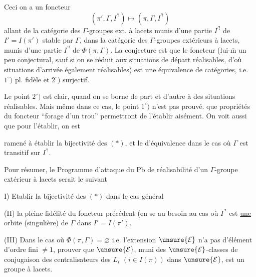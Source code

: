 Ceci   on a  un foncteur
\[
(\pi',\Gamma,I^{\prime !})\longmapsto(\pi,\Gamma,I^{\prime !})
\]
allant de la catégorie des $\Gamma$-groupes ext. à lacets
 munis d'une partie $I^{\prime !}$ de $I'=I(\pi')$ stable
par $\Gamma$, dans la catégorie des $\Gamma$-groupes extérieurs à lacets, munis d'une partie $I^{\prime !}$ de
$\Phi(\pi,\Gamma)$. La conjecture est que le foncteur
(lui-$\overline{\mathrm m}$ un peu conjectural, sauf si on se réduit aux situations de départ réalisables, d'où situations d'arrivée également réalisables) est une équivalence de catégories, i.e. $1^\circ)$ pl. fidèle et $2^\circ)$  surjectif. 

Le point $2^\circ)$ est clair, quand on se borne de part et d'autre à des situations réalisables. Mais même dans ce cas, le point $1^\circ)$ n'est pas prouvé.
  que
propriétés du foncteur ``forage d'un trou'' permettront de l'établir aisément. On voit aussi que pour l'établir, on est

ramené à établir la bijectivité des $(*)$, et le  d'équivalence dans le cas où $\Gamma$ est transitif sur $I^{\prime !}$.

Pour résumer, le Programme d'attaque du Pb de réalisabilité d'un $\Gamma$-groupe extérieur à lacets serait le suivant

I) Etablir la bijectivité des $(*)$ dans le cas général

(II)  la pleine fidélité du foncteur précédent (en se  au besoin au cas où $I^{\prime !}$ est \uline{une} orbite (singulière) de $\Gamma$ dans $I'=I(\pi')$.

(III) Dans le cas où $\Phi(\pi,\Gamma)=\varnothing$ i.e. l'extension $\unsure{\mathcal E}$ n'a pas d'élément d'ordre fini $\ne1$, prouver que $\unsure{\mathcal E}$, muni  des $\unsure{\mathcal E}$-classes de conjugaison des centralisateurs des $L_i$ $(i\in I(\pi))$ dans $\unsure{\mathcal E}$, est un groupe à lacets.

